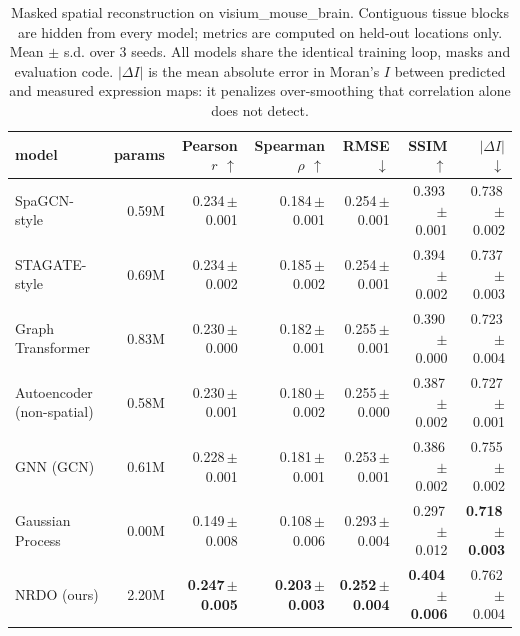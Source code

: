 \begin{table}[htbp]
\centering
\footnotesize
\setlength{\tabcolsep}{3pt}
\caption{Masked spatial reconstruction on visium\_mouse\_brain. Contiguous tissue blocks are hidden from every model; metrics are computed on held-out locations only. Mean $\pm$ s.d. over 3 seeds. All models share the identical training loop, masks and evaluation code. $|\Delta I|$ is the mean absolute error in Moran's $I$ between predicted and measured expression maps: it penalizes over-smoothing that correlation alone does not detect.}
\label{tab:benchmark}
\begin{tabular}{lrrrrrr}
\toprule
model & params & Pearson $r$ $\uparrow$ & Spearman $\rho$ $\uparrow$ & RMSE $\downarrow$ & SSIM $\uparrow$ & $|\Delta I|$ $\downarrow$\\
\midrule
SpaGCN-style & 0.59M & 0.234\,\tiny{$\pm$ 0.001} & 0.184\,\tiny{$\pm$ 0.001} & 0.254\,\tiny{$\pm$ 0.001} & 0.393\,\tiny{$\pm$ 0.001} & 0.738\,\tiny{$\pm$ 0.002} \\
STAGATE-style & 0.69M & 0.234\,\tiny{$\pm$ 0.002} & 0.185\,\tiny{$\pm$ 0.002} & 0.254\,\tiny{$\pm$ 0.001} & 0.394\,\tiny{$\pm$ 0.002} & 0.737\,\tiny{$\pm$ 0.003} \\
Graph Transformer & 0.83M & 0.230\,\tiny{$\pm$ 0.000} & 0.182\,\tiny{$\pm$ 0.001} & 0.255\,\tiny{$\pm$ 0.001} & 0.390\,\tiny{$\pm$ 0.000} & 0.723\,\tiny{$\pm$ 0.004} \\
Autoencoder (non-spatial) & 0.58M & 0.230\,\tiny{$\pm$ 0.001} & 0.180\,\tiny{$\pm$ 0.002} & 0.255\,\tiny{$\pm$ 0.000} & 0.387\,\tiny{$\pm$ 0.002} & 0.727\,\tiny{$\pm$ 0.001} \\
GNN (GCN) & 0.61M & 0.228\,\tiny{$\pm$ 0.001} & 0.181\,\tiny{$\pm$ 0.001} & 0.253\,\tiny{$\pm$ 0.001} & 0.386\,\tiny{$\pm$ 0.002} & 0.755\,\tiny{$\pm$ 0.002} \\
Gaussian Process & 0.00M & 0.149\,\tiny{$\pm$ 0.008} & 0.108\,\tiny{$\pm$ 0.006} & 0.293\,\tiny{$\pm$ 0.004} & 0.297\,\tiny{$\pm$ 0.012} & \textbf{0.718\,\tiny{$\pm$ 0.003}} \\
\midrule
NRDO (ours) & 2.20M & \textbf{0.247\,\tiny{$\pm$ 0.005}} & \textbf{0.203\,\tiny{$\pm$ 0.003}} & \textbf{0.252\,\tiny{$\pm$ 0.004}} & \textbf{0.404\,\tiny{$\pm$ 0.006}} & 0.762\,\tiny{$\pm$ 0.004} \\
\bottomrule
\end{tabular}
\end{table}
